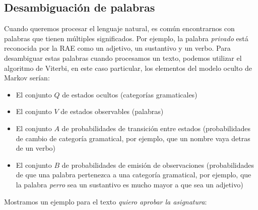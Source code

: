 \documentclass[11pt,openany]{book}
\begin{document}
\subsection{Desambiguación de palabras}
Cuando queremos procesar el lenguaje natural, es común encontrarnos con palabras que tienen
múltiples significados. Por ejemplo, la palabra \textit{privado} está reconocida por la RAE como 
un adjetivo, un sustantivo y un verbo. Para desambiguar estas palabras cuando procesamos
un texto, podemos utilizar el algoritmo de Viterbi, en este caso particular, 
los elementos del modelo oculto de Markov serían:
\begin{itemize}
      \boldmath
      \item El conjunto $Q$ de estados ocultos (categorías gramaticales)
      \item El conjunto $V$ de estados observables (palabras)
      \item El conjunto $A$ de probabilidades de transición entre estados (probabilidades de cambio de categoría gramatical, por ejemplo, que un nombre vaya detras de un verbo)
      \item El conjunto $B$ de probabilidades de emisión de observaciones (probabilidades de que una palabra pertenezca a una categoría gramatical, por ejemplo, 
      que la palabra \textit{perro} sea un sustantivo es mucho mayor a que sea un adjetivo)
\end{itemize}
Mostramos un ejemplo para el texto \textit{quiero aprobar la asignatura}:
\end{document}
